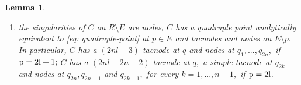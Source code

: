 \documentclass[plain]{amsart}
\newtheorem{lemma}[theorem]{\textbf{Lemma}}
\def\p{\rm{p}}
\begin{document}
\begin{lemma}
\begin{enumerate}
\begin{itemize}
\begin{eqnarray}
D_1\cap E\,\, (\mbox{resp.}\,\, D_2\cap E)& =& p+q_{2n}\,\,(\mbox{resp.}\,\,  p+q_{2n-1}),\label{even1}\\
C_1^j\cap E &=& q_{2j-1}+2q_{2j},\,\,1\leq j\leq n-1,\label{even2}\\
C_2^j\cap E &=& 2q_{2j}+q_{2j+1},\,\,1\leq j\leq n-2,\label{even3}\\
C^{n-1}_2\cap E &=& 2q_{2n-2}+q_{2n}\,\,\,\,and\label{even4}\\
 L_1\cap E\,\,(\mbox{resp.}\,\, L_2\cap E ) &=& (2nl-2n-2)q+2p+q_{2n-1}\label{even5}\\
&& ( \mbox{resp.}\,\,  (2nl-2n-2)q+2p+x,\,\,\mbox{where}\nonumber\\
&&x=q_2\,\,\mbox{if}\,\,
n=1\,\,\mbox{and}\,\,x=q_1\,\,\mbox{if}\,\,n>1);\nonumber
\end{eqnarray}
\end{itemize}
\item the singularities of $C$ on $R\setminus E$ are nodes, $C$ has a quadruple point
analytically equivalent to \eqref{eq: quadruple-point} at $p\in E$ and tacnodes and nodes on $E\setminus p.$
In particular, $C$ has a $(2nl-3)$-tacnode at $q$ and nodes at $q_1,...,q_{2n},$  if $\p=2l+1;$ 
$C$ has a $(2nl-2n-2)$-tacnode at $q,$ a simple tacnode at $q_{2k}$ 
and nodes at $q_{2n},q_{2n-1}$ and $q_{2k-1},$  for every $k=1,...,n-1,$  if $\p=2l$.
\end{enumerate}
\end{lemma}
\end{document}
